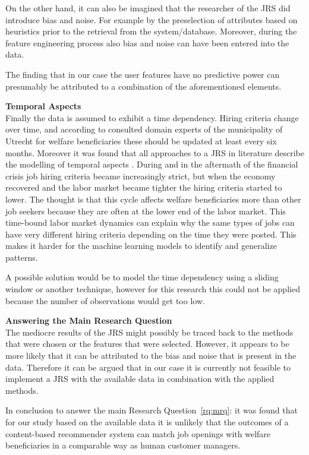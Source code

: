 On the other hand, it can also be imagined that the researcher of the JRS did introduce bias and noise.
For example by the preselection of attributes based on heuristics prior to the retrieval from the system/database.
Moreover, during the feature engineering process also bias and noise can have been entered into the data.

The finding that in our case the user features have no predictive power can presumably be attributed to a combination of the aforementioned elements. 

\noindent
\textbf{Temporal Aspects} \\
Finally the data is assumed to exhibit a time dependency.
Hiring criteria change over time, and according to consulted domain experts of the municipality of Utrecht for welfare beneficiaries these should be updated at least every six months. 
Moreover it was found that all approaches to a JRS in literature describe the modelling of temporal aspects  \cite{kenthapadi2017personalized, T.Al-Otaibi2012ASystems, Zheng2012JobSurvey, hong2013job}.
During and in the aftermath of the financial crisis job hiring criteria became increasingly strict, but when the economy recovered and the labor market became tighter the hiring criteria started to lower. 
The thought is that this cycle affects welfare beneficiaries more than other job seekers because they are often at the lower end of the labor market.
This time-bound labor market dynamics can explain why the same types of jobs can have very different hiring criteria depending on the time they were posted.
This makes it harder for the machine learning models to identify and generalize patterns.

A possible solution would be to model the time dependency using a sliding window or another technique, however for this research this could not be applied because the number of observations would get too low.

\noindent
\textbf{Answering the Main Research Question}\\
The mediocre results of the JRS might possibly be traced back to the methods that were chosen or the features that were selected. 
However, it appears to be more likely that it can be attributed to the bias and noise that is present in the data.
Therefore it can be argued that in our case it is currently not feasible to implement a JRS with the available data in combination with the applied methods. 

In conclusion to answer the main Research Question~\ref{rq:mrq}: it was found that for our study based on the available data it is unlikely that the outcomes of a content-based recommender system can match job openings with welfare beneficiaries in a comparable way as human customer managers. 


